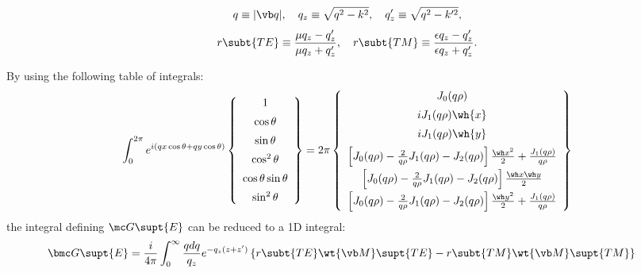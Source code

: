 \documentclass[letterpaper]{article}
\begin{document}
$$ q \equiv |\vb q|,
   \quad 
   q_z        \equiv \sqrt{ q^2 - k^2 },
   \quad
   q_z^\prime \equiv \sqrt{ q^2 - k^{\prime 2}},
$$
$$
   r\subt{TE} \equiv \frac{\mu q_z - q_z^\prime}{\mu q_z + q_z^\prime},
   \quad
   r\subt{TM} \equiv \frac{\epsilon q_z - q_z^\prime}{\epsilon q_z + q_z^\prime}.
$$

By using the following table of integrals:
\begin{align*}
 \int_0^{2\pi} e^{i(qx\cos\theta  + qy\cos\theta)} 
 \left\{\begin{array}{c}
 1 \\[5pt]
 \cos\theta \\[5pt]
 \sin\theta \\[5pt]
 \cos^2\theta \\[5pt]
 \cos\theta \sin\theta \\[5pt]
 \sin^2\theta \\
 \end{array}\right\}
= 2\pi \left\{ \begin{array}{c}
    J_0 (q\rho)         \\[5pt]
    i J_1(q\rho) \wh{x} \\[5pt]
    i J_1(q\rho) \wh{y} \\[5pt]
    \left[J_0(q\rho) - \frac{2}{q\rho} J_1(q\rho) - J_2(q\rho)\right]\frac{\wh x^2}{2} 
    + \frac{J_1(q\rho)}{q\rho} \\[5pt]
    \left[J_0(q\rho) - \frac{2}{q\rho} J_1(q\rho) - J_2(q\rho)\right]\frac{\wh x \wh y}{2}
    \\[5pt]
    \left[J_0(q\rho) - \frac{2}{q\rho} J_1(q\rho) - J_2(q\rho)\right]\frac{\wh y^2}{2} 
    + \frac{J_1(q\rho)}{q\rho}
  \end{array}\right\}
\end{align*}
the integral defining $\mc G\supt{E}$ can be reduced to a 1D integral:
\begin{align*}
 \bmc G\supt{E}
&=\frac{i}{4\pi} \int_0^\infty \frac{qdq}{q_z} e^{-q_z(z+z^\prime)}
  \left\{ r\subt{TE} \wt{\vb M}\supt{TE}
         -r\subt{TM} \wt{\vb M}\supt{TM}
  \right\}
\end{align*}
\end{document}
